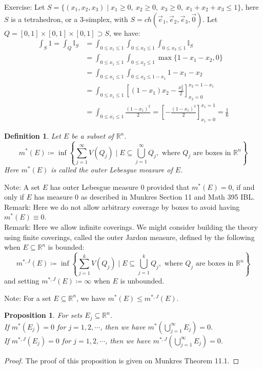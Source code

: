 \documentclass[11pt,oneside]{book}
\theoremstyle{break}
\theoremstyle{break}
\newtheorem{prop}[lem]{Proposition}
\newtheorem{defn}{Definition}[corL]
\newcommand{\R}{\mathbb{R}}
\newcommand{\note}{\color{red}Note: \color{black}}
\newcommand{\remark}{\color{blue}Remark: \color{black}}
\newcommand{\exercise}{\color{green}Exercise: \color{black}}
\begin{document}
\exercise Let $S = \{(x_1,x_2,x_3) \mid x_1 \geq 0,\ x_2\geq 0,\ x_3 \geq 0,\ x_1+x_2+x_3 \leq 1 \}$, here $S$ is a tetrahedron, or a $3$-simplex, with $S = ch( \vec{e}_1,\vec{e}_2,\vec{e}_3,\vec{0})$. Let $Q = [0,1]\times[0,1]\times[0,1]\supset S$, we have: 
\begin{align*}
\int_S 1 = \int_{Q} \mathbb{I}_S 
&= \int_{0\leq x_1\leq 1} \int_{0\leq x_2 \leq 1} \int_{0\leq x_3 \leq 1} \mathbb{I}_S 
\\&= \int_{0\leq x_1 \leq 1} \int_{0\leq x_2 \leq 1} \max\{ 1-x_1-x_2, 0\} 
\\&= \int_{0 \leq x_1 \leq 1} \int_{0 \leq x_2 \leq 1-x_1} 1-x_1-x_2
\\&= \int_{0\leq x_1 \leq 1} \left[(1-x_1) x_2 - \frac{x_2^2}{2}\right]^{x_2 = 1-x_1}_{x_2 = 0}
\\&= \int_{0\leq x_1 \leq 1} \frac{(1-x_1)^2}{2} = \left[-\frac{(1-x_1)^3}{2}\right]_{x_1 = 0}^{x_1=1} = \frac{1}{6}
\end{align*}





\begin{defn}
Let $E$ be a subset of $\R^n$. $$m^*(E) \coloneqq  \inf\left\{\sum_{j=1}^\infty V(Q_j) \mid E \subseteq \bigcup_{j=1}^\infty Q_j, \text{ where } Q_j \text{ are boxes in }\R^n \right\} $$
Here $m^*(E)$ is called the outer Lebesgue measure of $E$.
\end{defn}

\note A set $E$ has outer Lebesgue measure $0$ provided that $m^*(E) = 0$, if and only if $E$ has measure $0$ as described in Munkres Section 11 and Math 395 IBL. \\
\remark Here we do not allow arbitrary coverage by boxes to avoid having $m^*(E) \equiv 0$.\\
\remark Here we allow infinite coverings. We might consider building the theory using finite coverings, called the outer Jardon measure, defined by the following when $E\subseteq \R^n$ is bounded:
$$m^{*,J}(E) \coloneqq  \inf\left\{\sum_{j=1}^k V(Q_j) \mid E \subseteq \bigcup_{j=1}^k Q_j, \text{ where } Q_j \text{ are boxes in }\R^n \right\} $$
and setting $m^{*,J}(E) \coloneqq \infty$ when $E$ is unbounded. 


\note For a set $E\subseteq \R^n$, we have $m^*(E) \leq m^{*,J}(E)$.
\begin{prop}
For sets $E_j\subseteq \R^n$.\\ If $m^*(E_j) = 0$ for $j=1,2,\cdots$, then we have $m^*(\bigcup_{j=1}^\infty E_j) = 0$. \\If $m^{*,J}(E_j) = 0$ for $j=1,2,\cdots$, then we have $m^{*,J}(\bigcup_{j=1}^\infty E_j) = 0$.
\end{prop}
\begin{proof}
The proof of this proposition is given on Munkres Theorem 11.1.
\end{proof}
\end{document}
